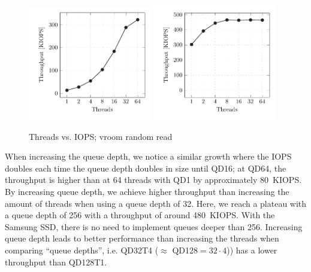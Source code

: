 \begin{figure}[H]
  \centering
   {\includegraphics[width=0.48\textwidth]{figures/vroom-iops-thread} \label{fig:vroom-iops-thread-qd1}}
   {\includegraphics[width=0.48\textwidth]{figures/vroom-iops-thread-qd32} \label{fig:vroom-iops-thread-qd32}}
  \caption{Threads vs. IOPS; vroom random read}
  \label{fig:vroom-iops-thread}
\end{figure}

When increasing the queue depth, we notice a similar growth where the IOPS doubles each time the queue depth doubles in size until QD16; at QD64, the throughput is higher than at 64 threads with QD1 by approximately \qty{80}{KIOPS}. By increasing queue depth, we achieve higher throughput than increasing the amount of threads when using a queue depth of 32. Here, we reach a plateau with a queue depth of 256 with a throughput of around \qty{480}{KIOPS}. With the Samsung SSD, there is no need to implement queues deeper than 256. Increasing queue depth leads to better performance than increasing the threads when comparing ``queue depths'', i.e. QD32T4 ($\approx$ QD128$=32 \cdot 4$)) has a lower throughput than QD128T1.

